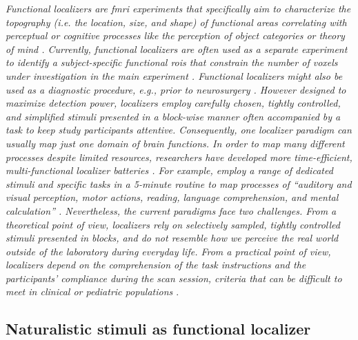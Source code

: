 \textit{\textit{Functional localizers} \citep[cf.][for reviews]{saxe2006divide,
friston2006critique} are \ac{fmri} experiments that specifically aim to
characterize the \textit{topography} (i.e. the location, size, and shape) of
functional areas correlating with perceptual or cognitive processes like the
perception of object categories \citep{kanwisher1997ffa} or theory of mind
\citep{spunt2014validating}.
Currently, functional localizers are often used as a separate experiment to
identify a subject-specific functional \acp{roi} that constrain the number of
voxels under investigation in the main experiment \citep{poldrack2007region,
saxe2006divide}.
Functional localizers might also be used as a diagnostic procedure, e.g., prior
to neurosurgery \citep[cf.][]{silva2018challenges, szaflarski2017practice}.
However designed to maximize detection power, localizers employ carefully
chosen, tightly controlled, and simplified stimuli presented in a block-wise
manner often accompanied by a task to keep study participants attentive.
Consequently, one localizer paradigm can usually map just one domain of brain
functions.
In order to map many different processes despite limited resources, researchers
have developed more time-efficient, multi-functional \textit{localizer
batteries} \citep[e.g.,][]{barch2013function, drobyshevsky2006rapid,
pinho2018individual, pinho2020individual, pinel2007fast}.
For example, \citet{pinel2007fast} employ a range of dedicated stimuli and
specific tasks in a 5-minute routine to map processes of ``auditory and visual
perception, motor actions, reading, language comprehension, and mental
calculation'' \citep[][p. 15]{pinel2007fast}.
Nevertheless, the current paradigms face two challenges.
From a theoretical point of view, localizers rely on selectively sampled,
tightly controlled stimuli presented in blocks, and do not resemble how we
perceive the real world outside of the laboratory during everyday life.
From a practical point of view, localizers depend on the comprehension of the
task instructions and the participants' compliance during the scan session,
criteria that can be difficult to meet in clinical or pediatric populations
\citep{eickhoff2020towards, vanderwal2015inscapes, vanderwal2019movies}}.


\subsection{Naturalistic stimuli as functional localizer}

